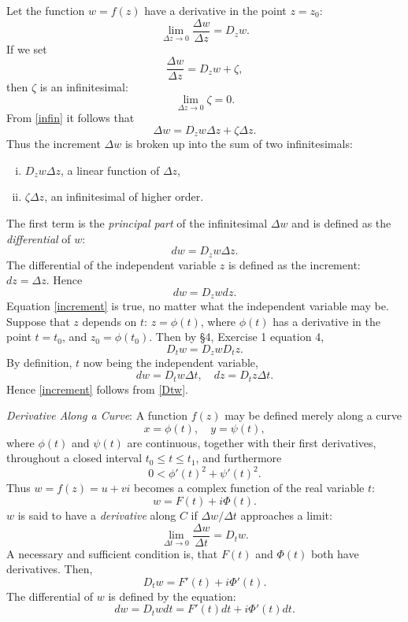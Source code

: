 \documentclass[twosided]{memoir}
\begin{document}
Let the function $w=f(z)$ have a derivative in the point $z=z_0$:
\[
\lim\limits_{\Delta z \to 0} \frac{\Delta w}{\Delta z} =D_z w
.\] If we set
\begin{equation}\label{infin}
\frac{\Delta w}{\Delta z} =D_zw+\zeta,
\end{equation}
then $\zeta$ is an infinitesimal:
\[
\lim\limits_{\Delta z \to 0} \zeta = 0
.\] From \ref{infin} it follows that
\[
\Delta w=D_zw\Delta z+\zeta \Delta z
.\] Thus the increment $\Delta w$ is broken up into the sum of two infinitesimals:
\begin{enumerate}[i.]
\item $D_zw\Delta z$, a linear function of $\Delta z$,
\item $\zeta \Delta z$, an infinitesimal of higher order.
\end{enumerate} The first term is the \emph{principal part} of the infinitesimal $\Delta w$ and is defined as the \emph{differential} of $w$:
\begin{equation}\label{differential}
dw=D_zw\Delta z.
\end{equation} The differential of the independent variable $z$ is defined as the increment: $dz=\Delta z$. Hence
\begin{equation}\label{increment}
dw=D_zwdz.
\end{equation}
Equation \ref{increment} is true, no matter what the independent variable may be. Suppose that $z$ depends on $t$: $z=\phi (t)$, where $\phi (t)$ has a derivative in the point $t=t_0$, and $z_0=\phi (t_0)$. Then by \S 4, Exercise 1 equation 4,
\begin{equation}\label{Dtw}
D_tw=D_zwD_tz.
\end{equation}
By definition, $t$ now being the independent variable,
\[
dw=D_tw\Delta t, \quad dz=D_t z\Delta t
.\] Hence \ref{increment} follows from \ref{Dtw}. 

\emph{Derivative Along a Curve}: A function $f(z)$ may be defined merely along a curve
 \[
	 x=\phi (t), \quad y=\psi (t)
 ,\] where $\phi (t)$ and $\psi(t)$ are continuous, together with their first derivatives, throughout a closed interval $t_0\le t\le t_1$, and furthermore
 \[
	 0<\phi '(t)^2+\psi'(t)^2
 .\] Thus $w=f(z)=u+vi$ becomes a complex function of the real variable $t$:
 \[
	 w=F(t)+i\Phi (t)
 .\] $w$ is said to have a \emph{derivative} along $C$ if $\Delta w / \Delta t$ approaches a limit:
 \[
 \lim\limits_{\Delta t \to 0} \frac{\Delta w}{\Delta t} =D_tw
 .\] A necessary and sufficient condition is, that $F(t)$ and $\Phi(t)$ both have derivatives. Then,
 \begin{equation}\label{Dphi}
	 D_tw=F'(t)+i\Phi'(t).
 \end{equation} The differential of $w$ is defined by the equation:
 \begin{equation}
	 dw=D_twdt=F'(t)dt+i\Phi'(t)dt.
 \end{equation}
\end{document}
